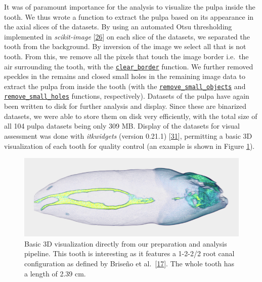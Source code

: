\documentclass[
  american,
]{article}
\begin{document}
It was of paramount importance for the analysis to visualize the pulpa inside the tooth.
We thus wrote a function to extract the pulpa based on its appearance in the axial slices of the datasets.
By using an automated Otsu thresholding implemented in \emph{scikit-image} {[}\protect\hyperlink{ref-stvWEJeu}{26}{]} on each slice of the datasets, we separated the tooth from the background.
By inversion of the image we select all that is not tooth.
From this, we remove all the pixels that touch the image border i.e.~the air surrounding the tooth, with the \href{https://scikit-image.org/docs/dev/api/skimage.segmentation.html\#skimage.segmentation.clear_border}{\texttt{clear\_border}} function.
We further removed speckles in the remains and closed small holes in the remaining image data to extract the pulpa from inside the tooth (with the \href{https://scikit-image.org/docs/dev/api/skimage.morphology.html\#skimage.morphology.remove_small_objects}{\texttt{remove\_small\_objects}} and
\href{https://scikit-image.org/docs/dev/api/skimage.morphology.html\#skimage.morphology.remove_small_holes}{\texttt{remove\_small\_holes}} functions, respectively).
Datasets of the pulpa have again been written to disk for further analysis and display.
Since these are binarized datasets, we were able to store them on disk very efficiently, with the total size of all 104 pulpa datasets being only 309 MB.
Display of the datasets for visual assessment was done with \emph{itkwidgets} (version 0.21.1) {[}\protect\hyperlink{ref-v85zR2Z2}{31}{]}, permitting a basic 3D visualization of each tooth for quality control (an example is shown in Figure \ref{fig:3ditkwidgets}).

\begin{figure}
\hypertarget{fig:3ditkwidgets}{%
\centering
\includegraphics{images/Tooth045.itkwidgets.png}
\caption{Basic 3D visualization directly from our preparation and analysis pipeline.
This tooth is interesting as it features a 1-2-2/2 root canal configuration as defined by Briseño et al.~{[}\protect\hyperlink{ref-ZTgDEakx}{17}{]}.
The whole tooth has a length of 2.39 cm.}\label{fig:3ditkwidgets}
}
\end{figure}
\end{document}
